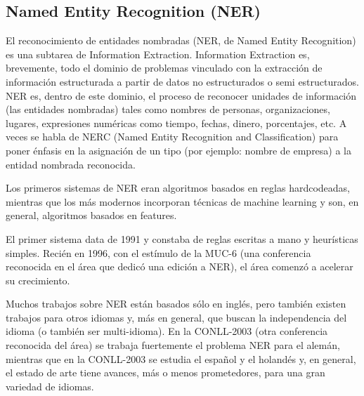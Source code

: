 \subsection{Named Entity Recognition (NER)}
\label{subsec:nerc}

El reconocimiento de entidades nombradas (NER, de Named Entity
Recognition) es una subtarea de Information Extraction. Information
Extraction es, brevemente, todo el dominio de problemas vinculado con
la extracción de información estructurada a partir de datos no
estructurados o semi estructurados. NER es, dentro de este dominio, el
proceso de reconocer unidades de información (las entidades
nombradas) tales como nombres de personas, organizaciones, lugares,
expresiones numéricas como tiempo, fechas, dinero, porcentajes, etc.
A veces se habla de NERC (Named Entity Recognition and Classification)
para poner énfasis en la asignación de un tipo (por ejemplo: nombre
de empresa) a la entidad nombrada reconocida.

Los primeros sistemas de NER eran algoritmos basados en reglas
hardcodeadas, mientras que los más modernos incorporan técnicas de
machine learning y son, en general, algoritmos basados en features.

El primer sistema data de 1991 y constaba de reglas escritas a mano y
heurísticas simples. Recién en 1996, con el estímulo de la MUC-6
(una conferencia reconocida en el área que dedicó una edición a
NER), el área comenzó a acelerar su crecimiento.

Muchos trabajos sobre NER están basados sólo en inglés, pero también existen trabajos para otros idiomas y, más en general, que buscan la independencia del idioma (o también ser multi-idioma). En la CONLL-2003 (otra conferencia reconocida del área) se trabaja fuertemente el problema NER para el alemán, mientras que en la CONLL-2003 se estudia el español y el holandés y, en general, el estado de arte tiene avances, más o menos prometedores, para una gran variedad de idiomas.


